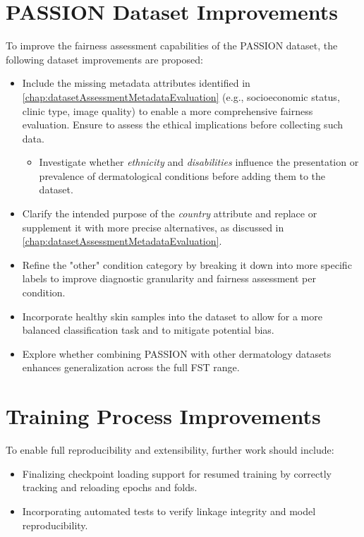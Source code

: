 \documentclass[12pt, a4paper, oneside]{book}   	%
\begin{document}
		
		\section{PASSION Dataset Improvements}
		To improve the fairness assessment capabilities of the PASSION dataset, the following dataset improvements are proposed:
		\begin{itemize}
			\item Include the missing metadata attributes identified in \autoref{chap:datasetAssessmentMetadataEvaluation} (e.g., socioeconomic status, clinic type, image quality) to enable a more comprehensive fairness evaluation. Ensure to assess the ethical implications before collecting such data.
			\begin{itemize}
				\item Investigate whether \textit{ethnicity} and \textit{disabilities} influence the presentation or prevalence of dermatological conditions before adding them to the dataset.
			\end{itemize}
						
			\item Clarify the intended purpose of the \textit{country} attribute and replace or supplement it with more precise alternatives, as discussed in \autoref{chap:datasetAssessmentMetadataEvaluation}.
			
			\item Refine the "other" condition category by breaking it down into more specific labels to improve diagnostic granularity and fairness assessment per condition.
			
			\item Incorporate healthy skin samples into the dataset to allow for a more balanced classification task and to mitigate potential bias.
			
			\item Explore whether combining PASSION with other dermatology datasets enhances generalization across the full \gls{FST} range.
		\end{itemize}
		
		
		\section{Training Process Improvements}
		To enable full reproducibility and extensibility, further work should include:
		
		\begin{itemize}
			\item Finalizing checkpoint loading support for resumed training by correctly tracking and reloading epochs and folds.
			\item Incorporating automated tests to verify linkage integrity and model reproducibility.
		\end{itemize}
		
\end{document}
